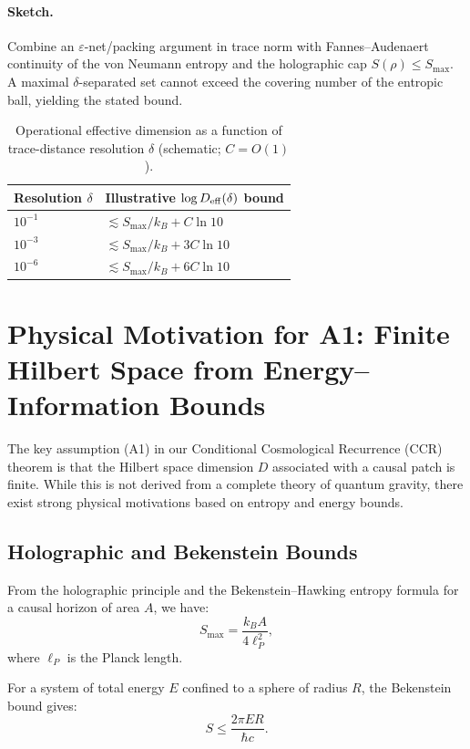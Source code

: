 \documentclass[12pt]{article}
\theoremstyle{remark}
\begin{document}
\paragraph{Sketch.} Combine an $\varepsilon$-net/packing argument in trace norm with Fannes--Audenaert continuity of the von Neumann entropy and the holographic cap $S(\rho)\le S_{\max}$. A maximal $\delta$-separated set cannot exceed the covering number of the entropic ball, yielding the stated bound.

\begin{table}[H]
  \centering
  \begin{tabular}{l l}
    \hline
    Resolution $\delta$ & Illustrative $\log D_{\rm eff}(\delta)$ bound \\
    \hline
    $10^{-1}$ & $\lesssim S_{\max}/k_B + C\ln 10$ \\
    $10^{-3}$ & $\lesssim S_{\max}/k_B + 3C\ln 10$ \\
    $10^{-6}$ & $\lesssim S_{\max}/k_B + 6C\ln 10$ \\
    \hline
  \end{tabular}
  \caption{Operational effective dimension as a function of trace-distance resolution $\delta$ (schematic; $C=O(1)$).}
  \label{tab:Deff}
\end{table}


\section{Physical Motivation for A1: Finite Hilbert Space from Energy--Information Bounds}
\label{sec:motivation_A1}

The key assumption (A1) in our Conditional Cosmological Recurrence (CCR) theorem is that the Hilbert space dimension \(D\) associated with a causal patch is finite. While this is not derived from a complete theory of quantum gravity, there exist strong physical motivations based on entropy and energy bounds.

\subsection{Holographic and Bekenstein Bounds}
From the holographic principle and the Bekenstein--Hawking entropy formula for a causal horizon of area \(A\), we have:
\begin{equation}
S_{\max} = \frac{k_B A}{4 \ell_P^2},
\end{equation}
where \(\ell_P\) is the Planck length.

For a system of total energy \(E\) confined to a sphere of radius \(R\), the Bekenstein bound gives:
\begin{equation}
S \le \frac{2\pi E R}{\hbar c}.
\end{equation}
\end{document}
